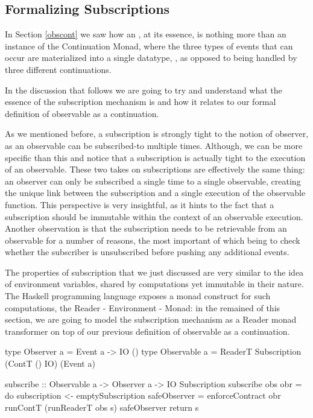 \subsection{Formalizing Subscriptions}

In Section \ref{obscont} we saw how an , at its essence, is nothing more than an instance of the Continuation Monad, where the three types of events that can occur are materialized into a single datatype, , as opposed to being handled by three different continuations.

In the discussion that follows we are going to try and understand what the essence of the subscription mechanism is and how it relates to our formal definition of observable as a continuation. 

As we mentioned before, a subscription is strongly tight to the notion of observer, as an observable can be subscribed-to multiple times. Although, we can be more specific than this and notice that a subscription is actually tight to the execution of an observable. These two takes on subscriptions are effectively the same thing: an observer can only be subscribed a single time to a single observable, creating the unique link between the subscription and a single execution of the observable function. This perspective is very insightful, as it hints to the fact that a subscription should be immutable within the context of an observable execution. Another observation is that the subscription needs to be retrievable from an observable for a number of reasons, the most important of which being to check whether the subscriber is unsubscribed before pushing any additional events.

The properties of subscription that we just discussed are very similar to the idea of environment variables, shared by computations yet immutable in their nature. The Haskell programming language exposes a monad construct for such computations, the Reader - Environment - Monad: in the remained of this section, we are going to model the subscription mechanism as a Reader monad transformer on top of our previous definition of observable as a continuation.

\hminted
type Observer   a = Event a -> IO ()
type Observable a = ReaderT Subscription (ContT () IO) (Event a)

subscribe :: Observable a -> Observer a -> IO Subscription
subscribe obs obr = do 
    subscription <- emptySubscription
	safeObserver  = enforceContract obr
    runContT (runReaderT obs s) safeObserver
    return s
    
